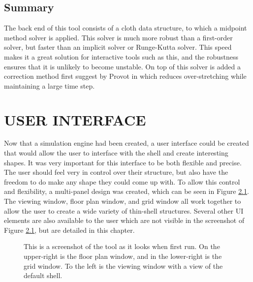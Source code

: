 \documentclass{thesis}
\begin{document}
\section{Summary}
The back end of this tool consists of a cloth data structure, to which a midpoint method solver is applied.  This solver is much more
robust than a first-order solver, but faster than an implicit solver or Runge-Kutta solver.  This speed makes it a great solution
for interactive tools such as this, and the robustness ensures that it is unlikely to become unstable.  On top of this solver is
added a correction method first suggest by Provot in \cite{provot95deformationconstraints} which reduces over-stretching while
maintaining a large time step.


\chapter{USER INTERFACE}
Now that a simulation engine had been created, a user interface could be created that would allow the user to interface with the
shell and create interesting shapes.  It was very important for this interface to be both flexible and precise.  The user should
feel very in control over their structure, but also have the freedom to do make any shape they could come up with.  To allow this
control and flexibility, a multi-panel design was created, which can be seen in Figure \ref{fig:basic}.  The viewing window,
floor plan window, and grid window all work together to allow the user to create a wide variety of thin-shell structures.  Several
other UI elements are also available to the user which are not visible in the screenshot of Figure \ref{fig:basic}, but are
detailed in this chapter.

\begin{figure}
\caption[The tool]{This is a screenshot of the tool as it looks when first run.  On the upper-right is the floor plan window, and
in the lower-right is the grid window.  To the left is the viewing window with a view of the default shell.}
\label{fig:basic}
\end{figure}
\end{document}
